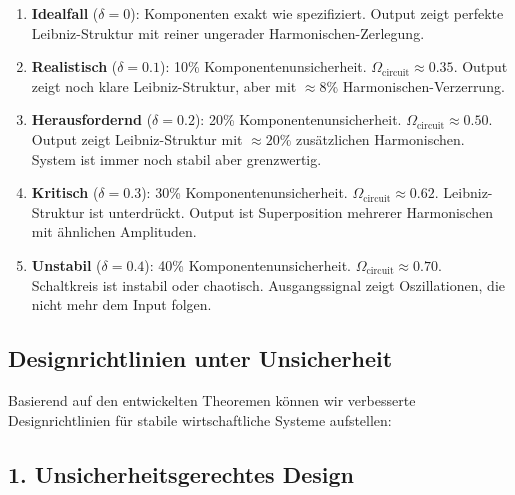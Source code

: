 \documentclass[a4paper, 12pt, twoside, openright]{report}
\theoremstyle{definition}
\theoremstyle{definition}
\begin{document}
\begin{enumerate}
    \item \textbf{Idealfall} ($\delta = 0$): Komponenten exakt wie spezifiziert. Output zeigt perfekte Leibniz-Struktur mit reiner ungerader Harmonischen-Zerlegung.
    
    \item \textbf{Realistisch} ($\delta = 0.1$): 10\% Komponentenunsicherheit. $\Omega_{\text{circuit}} \approx 0.35$. Output zeigt noch klare Leibniz-Struktur, aber mit $\approx 8\%$ Harmonischen-Verzerrung.
    
    \item \textbf{Herausfordernd} ($\delta = 0.2$): 20\% Komponentenunsicherheit. $\Omega_{\text{circuit}} \approx 0.50$. Output zeigt Leibniz-Struktur mit $\approx 20\%$ zusätzlichen Harmonischen. System ist immer noch stabil aber grenzwertig.
    
    \item \textbf{Kritisch} ($\delta = 0.3$): 30\% Komponentenunsicherheit. $\Omega_{\text{circuit}} \approx 0.62$. Leibniz-Struktur ist unterdrückt. Output ist Superposition mehrerer Harmonischen mit ähnlichen Amplituden.
    
    \item \textbf{Unstabil} ($\delta = 0.4$): 40\% Komponentenunsicherheit. $\Omega_{\text{circuit}} \approx 0.70$. Schaltkreis ist instabil oder chaotisch. Ausgangssignal zeigt Oszillationen, die nicht mehr dem Input folgen.
\end{enumerate}

\subsection{Designrichtlinien unter Unsicherheit}

Basierend auf den entwickelten Theoremen können wir verbesserte Designrichtlinien für stabile wirtschaftliche Systeme aufstellen:

\subsection{1. Unsicherheitsgerechtes Design}
\end{document}

